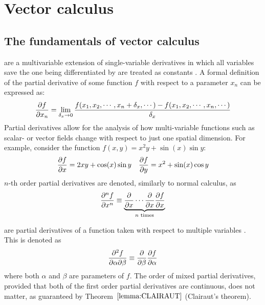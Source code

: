 \section{Vector calculus}
\subsection{The fundamentals of vector calculus}

\begin{defn}
	 are a multivariable extension of single-variable derivatives in which all
	variables save the one being differentiated by are treated as constants \cite{MORTIMER201389}. A formal definition
	of the partial derivative of some function $f$ with respect to a parameter $x_n$ can be expressed as:
	\begin{equation}
		\pdv{f}{x_n}=\lim_{\delta_x\rightarrow0}\frac{f(x_1,x_2,\cdots,x_n+\delta_x,\cdots)-f(x_1,x_2,\cdots,x_n,\cdots)}{\delta_x}
	\end{equation}
	Partial derivatives allow for the analysis of how multi-variable functions such as scalar- or vector fields change
	with respect to just one spatial dimension. For example, consider the function $f(x,y)=x^2y+\sin(x)\sin y$:
	\begin{align*}
		\pdv{f}{x}=2xy+\cos(x)\sin y&&\pdv{f}{y}=x^2+\sin(x)\cos y
	\end{align*}
	$n$-th order partial derivatives are denoted, similarly to normal calculus, as
	$$
	\pdv[n]{f}{x}\equiv\underbrace{\pdv{x}\cdots\pdv{x}\pdv{f}{x}}_{n\text{ times}}
	$$
\end{defn}
\begin{defn}
	 are partial derivatives of a function taken with respect to multiple
	variables \cite{GARRETT2015377}. This is denoted as
	$$
	\pdv{f}{\alpha}{\beta}\equiv\pdv{\beta}\pdv{f}{\alpha}
	$$
	where both $\alpha$ and $\beta$ are parameters of $f$. The order of mixed partial derivatives, provided that both of the first order partial
	derivatives are continuous, does not matter, as guaranteed by Theorem~$\ref{lemma:CLAIRAUT}$ (Clairaut's theorem).
\end{defn}

